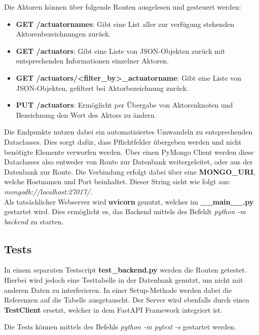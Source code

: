 Die Aktoren können über folgende Routen ausgelesen und gesteuert werden:
\begin{itemize}
\item \textbf{GET /actuatornames}: Gibt eine List aller zur verfügung stehenden Aktorenbezeichnungen zurück.
\item \textbf{GET /actuators}: Gibt eine Liste von JSON-Objekten zurück mit entsprechenden Informationen einzelner Aktoren.
\item \textbf{GET /actuators/<filter\_by>\_actuatorname}: Gibt eine Liste von JSON-Objekten, gefiltert bei Aktorbezeichnung zurück.
\item \textbf{PUT /actuators}: Ermöglicht per Übergabe von Aktorenknoten und Bezeichnung den Wert des Aktors zu ändern.
\end{itemize}

Die Endpunkte nutzen dabei ein automatisiertes Umwandeln zu entsprechenden Dataclasses.
Dies sorgt dafür, dass Pflichtfelder übergeben werden und nicht benötigte Elemente verworfen werden.
Über einen PyMongo Client werden diese Dataclasses also entweder von Route zur Datenbank weitergeleitet, oder aus der Datenbank zur Route.
Die Verbindung erfolgt dabei über eine \textbf{MONGO\_URI}, welche Hostnamen und Port beinhaltet. Dieser String sieht wie folgt aus: \textit{mongodb://localhost:27017/}. \\
Als tatsächlicher Webserver wird \textbf{uvicorn} genutzt, welcher im \textbf{\_\_main\_\_.py} gestartet wird. Dies ermöglicht es, das Backend mittels des Befehlt \textit{python -m backend} zu starten.

\subsection{Tests}
In einem separaten Testscript \textbf{test\_backend.py} werden die Routen getestet. 
Hierbei wird jedoch eine Testtabelle in der Datenbank genutzt, um nicht mit anderen Daten zu interferieren. 
In einer Setup-Methode werden dabei die Referenzen auf die Tabelle ausgetauscht. 
Der Server wird ebenfalls durch einen \textbf{TestClient} ersetzt, welcher in dem FastAPI Framework integriert ist.

Die Tests können mittels des Befehls \textit{python -m pytest -s} gestartet werden.
